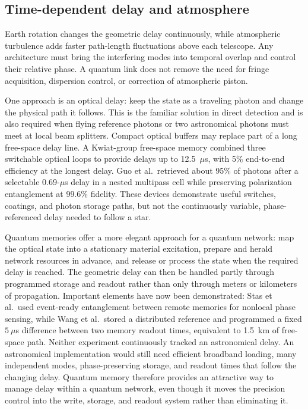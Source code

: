 \documentclass[]{spie}
\newcommand{\etal}{et al.}
\begin{document}
\subsection{Time-dependent delay and atmosphere}

Earth rotation changes the geometric delay continuously, while atmospheric turbulence adds faster path-length fluctuations above each telescope. Any architecture must bring the interfering modes into temporal overlap and control their relative phase. A quantum link does not remove the need for fringe acquisition, dispersion control, or correction of atmospheric piston.

One approach is an optical delay: keep the state as a traveling photon and change the physical path it follows. This is the familiar solution in direct detection and is also required when flying reference photons or two astronomical photons must meet at local beam splitters. Compact optical buffers may replace part of a long free-space delay line. A Kwiat-group free-space memory combined three switchable optical loops to provide delays up to 12.5~$\mu$s, with 5\% end-to-end efficiency at the longest delay.\cite{Arnold2023} Guo \etal\ retrieved about 95\% of photons after a selectable 0.69-$\mu$s delay in a nested multipass cell while preserving polarization entanglement at 99.6\% fidelity.\cite{Guo2026} These devices demonstrate useful switches, coatings, and photon storage paths, but not the continuously variable, phase-referenced delay needed to follow a star.

Quantum memories offer a more elegant approach for a quantum network: map the optical state into a stationary material excitation, prepare and herald network resources in advance, and release or process the state when the required delay is reached. The geometric delay can then be handled partly through programmed storage and readout rather than only through meters or kilometers of propagation. Important elements have now been demonstrated: Stas \etal\ used event-ready entanglement between remote memories for nonlocal phase sensing, while Wang \etal\ stored a distributed reference and programmed a fixed $5~\mu$s difference between two memory readout times, equivalent to 1.5~km of free-space path.\cite{Stas2026,Wang2026} Neither experiment continuously tracked an astronomical delay. An astronomical implementation would still need efficient broadband loading, many independent modes, phase-preserving storage, and readout times that follow the changing delay. Quantum memory therefore provides an attractive way to manage delay within a quantum network, even though it moves the precision control into the write, storage, and readout system rather than eliminating it.
\end{document}
